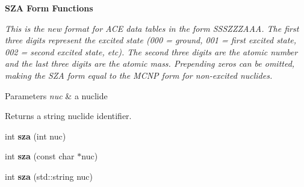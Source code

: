 \begin{Indent}{\bf S\+ZA Form Functions}\par
{\em This is the new format for A\+CE data tables in the form S\+S\+S\+Z\+Z\+Z\+A\+AA. The first three digits represent the excited state (000 = ground, 001 = first excited state, 002 = second excited state, etc). The second three digits are the atomic number and the last three digits are the atomic mass. Prepending zeros can be omitted, making the S\+ZA form equal to the M\+C\+NP form for non-\/excited nuclides. 
\begin{DoxyParams}{Parameters}
{\em nuc} & a nuclide \\
\hline
\end{DoxyParams}
\begin{DoxyReturn}{Returns}
a string nuclide identifier. 
\end{DoxyReturn}
}\begin{DoxyCompactItemize}
\item 
int {\bfseries sza} (int nuc)\hypertarget{namespacepyne_1_1nucname_a4e8f78a4dca435b5b7098a34fe20a76b}{}\label{namespacepyne_1_1nucname_a4e8f78a4dca435b5b7098a34fe20a76b}

\item 
int {\bfseries sza} (const char $\ast$nuc)\hypertarget{namespacepyne_1_1nucname_adbcf02b0748a34d84e3641997caa38ef}{}\label{namespacepyne_1_1nucname_adbcf02b0748a34d84e3641997caa38ef}

\item 
int {\bfseries sza} (std\+::string nuc)\hypertarget{namespacepyne_1_1nucname_a94c67c8e183760971dfa262057a0deb4}{}\label{namespacepyne_1_1nucname_a94c67c8e183760971dfa262057a0deb4}

\end{DoxyCompactItemize}
\end{Indent}
